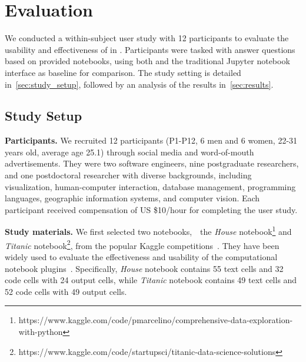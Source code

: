 \section{Evaluation}

We conducted a within-subject user study with 12 participants to evaluate the usability and effectiveness of \tool in  .
Participants were tasked with 
answer questions based on provided notebooks, using both \tool and the traditional Jupyter notebook interface as  baseline for comparison.
The study setting is detailed in~\autoref{sec:study_setup}, followed by an analysis of the results in~\autoref{sec:results}.


\subsection{Study Setup}
\label{sec:study_setup}

\textbf{Participants.}
We recruited 12 participants (P1-P12, 6 men and 6 women, 22-31 years old, average age 25.1) through social media and word-of-mouth advertisements.
They were two software engineers, nine postgraduate researchers, and one postdoctoral researcher with diverse backgrounds, including visualization, human-computer interaction, database management, programming languages, geographic information systems, and computer vision.
Each participant received compensation of US \$10/hour for completing the user study.


\textbf{Study materials.}
We first selected two notebooks,~\ie~the \textit{House} notebook\footnote{https://www.kaggle.com/code/pmarcelino/comprehensive-data-exploration-with-python} 
and \textit{Titanic} notebook\footnote{https://www.kaggle.com/code/startupsci/titanic-data-science-solutions},
from the popular Kaggle competitions~\cite{wang2022documentation}.
They have been widely used to evaluate the effectiveness and usability of the computational notebook plugins~\cite{li2023notable, wang2024outlinespark, zheng2022nb2slides}.
Specifically, \textit{House} notebook contains 55 text cells and 32 code cells with 24 output cells, while \textit{Titanic} notebook contains 49 text cells and 52 code cells with 49 output cells.

